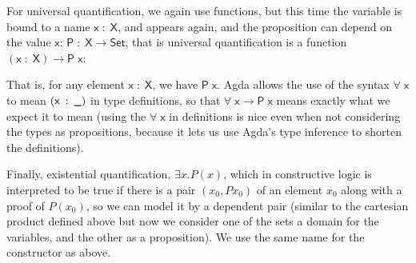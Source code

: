 \documentclass{article}
\newcommand{\Conid}[1]{\mathit{#1}}
\newcommand{\Varid}[1]{\mathit{#1}}
\def\resethooks{%
  \global\let\SaveRestoreHook\empty
  \global\let\ColumnHook\empty}
\newcommand{\hsindent}[1]{\quad}%
\let\hspre\empty
\let\hspost\empty
\renewcommand\Varid[1]{\mathord{\textsf{#1}}}
\let\Conid\Varid
\newcommand\Keyword[1]{\textsf{\textbf{#1}}}
\begin{document}
For universal quantification, we again use functions, but this time the variable is bound to a name \ensuremath{\Varid{x}\;\mathbin{:}\;\Conid{X}}, and appears again, and the proposition can depend on the value \ensuremath{\Varid{x}}: \ensuremath{\Conid{P}\;\mathbin{:}\;\Conid{X}\;\Varid{→}\;\Conid{Set}}, that is universal quantification is a function \ensuremath{(\Varid{x}\;\mathbin{:}\;\Conid{X})\;\Varid{→}\;\Conid{P}\;\Varid{x}}:
\resethooks
That is, for any element \ensuremath{\Varid{x}\;\mathbin{:}\;\Conid{X}}, we have \ensuremath{\Conid{P}\;\Varid{x}}. Agda allows the use of the syntax \ensuremath{\Varid{∀}\;\Varid{x}} to mean \ensuremath{(\Varid{x}\;\mathbin{:}\;\Varid{\char95 })} in type definitions, so that \ensuremath{\Varid{∀}\;\Varid{x}\;\Varid{→}\;\Conid{P}\;\Varid{x}} means exactly what we expect it to mean (using the \ensuremath{\Varid{∀}\;\Varid{x}} in definitions is nice even when not considering the types as propositions, because it lets us use Agda's type inference to shorten the definitions).

Finally, existential quantification, $\exists x. P(x)$, which in constructive logic is interpreted to be true if there is a pair $(x_0, P x_0)$ of an element  $x_0$ along with a proof of $P (x_0)$, so we can model it by a dependent pair (similar to the cartesian product defined above but now we consider one of the sets a domain for the variables, and the other as a proposition). We use the same name for the constructor as above.
\resethooks
\end{document}
